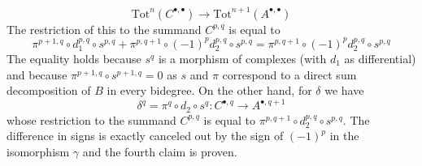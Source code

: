 \begin{remark}
$$\text{Tot}^n(C^{\bullet, \bullet}) \to
\text{Tot}^{n + 1}(A^{\bullet, \bullet})
$$
The restriction of this to the summand $C^{p, q}$ is equal to
$$
\pi^{p + 1, q} \circ
d_1^{p, q} \circ
s^{p, q} +
\pi^{p, q + 1} \circ
(-1)^p d_2^{p, q} \circ
s^{p, q} =
\pi^{p, q + 1} \circ
(-1)^p d_2^{p, q} \circ
s^{p, q}
$$
The equality holds because $s^q$ is a morphism of complexes (with $d_1$
as differential) and because $\pi^{p + 1, q} \circ s^{p + 1, q} = 0$
as $s$ and $\pi$ correspond to a direct sum decomposition of $B$
in every bidegree. On the other hand, for $\delta$ we have
$$
\delta^q =  \pi^q \circ d_2 \circ s^q :
C^{\bullet, q} \to A^{\bullet, q + 1}
$$
whose restriction to the summand $C^{p, q}$ is equal to
$\pi^{p, q + 1} \circ d_2^{p, q} \circ s^{p, q}$.
The difference in signs is exactly canceled out by the sign
of $(-1)^p$ in the isomorphism $\gamma$ and the fourth claim is proven.
\end{remark}

